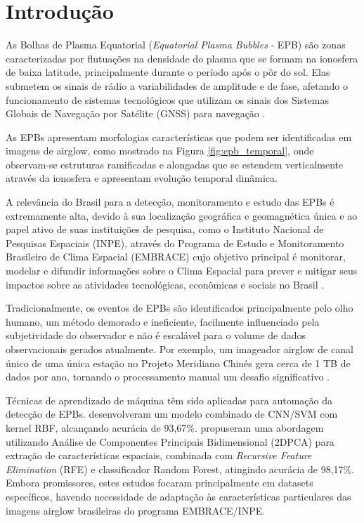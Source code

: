 \chapter{Introdução}

As Bolhas de Plasma Equatorial (\textit{Equatorial Plasma Bubbles} - EPB) são zonas caracterizadas por flutuações na densidade do plasma que se formam na ionosfera de baixa latitude, principalmente durante o período após o pôr do sol. Elas submetem os sinais de rádio a variabilidades de amplitude e de fase, afetando o funcionamento de sistemas tecnológicos que utilizam os sinais dos Sistemas Globais de Navegação por Satélite (GNSS) para navegação \cite{Githio2024}.

As EPBs apresentam morfologias características que podem ser identificadas em imagens de airglow, como mostrado na Figura \ref{fig:epb_temporal}, onde observam-se estruturas ramificadas e alongadas que se estendem verticalmente através da ionosfera e apresentam evolução temporal dinâmica.

A relevância do Brasil para a detecção, monitoramento e estudo das EPBs é extremamente alta, devido à sua localização geográfica e geomagnética única e ao papel ativo de suas instituições de pesquisa, como o Instituto Nacional de Pesquisas Espaciais (INPE), através do Programa de Estudo e Monitoramento Brasileiro de Clima Espacial (EMBRACE) cujo objetivo principal é monitorar, modelar e difundir informações sobre o Clima Espacial para prever e mitigar seus impactos sobre as atividades tecnológicas, econômicas e sociais no Brasil \cite{EMBRACE2021}.

Tradicionalmente, os eventos de EPBs são identificados principalmente pelo olho humano, um método demorado e ineficiente, facilmente influenciado pela subjetividade do observador e não é escalável para o volume de dados observacionais gerados atualmente. Por exemplo, um imageador airglow de canal único de uma única estação no Projeto Meridiano Chinês gera cerca de 1 TB de dados por ano, tornando o processamento manual um desafio significativo \cite{Zhong2025}.

Técnicas de aprendizado de máquina têm sido aplicadas para automação da detecção de EPBs.  desenvolveram um modelo combinado de CNN/SVM com kernel RBF, alcançando acurácia de 93,67\%.  propuseram uma abordagem utilizando Análise de Componentes Principais Bidimensional (2DPCA) para extração de características espaciais, combinada com \textit{Recursive Feature Elimination} (RFE) e classificador Random Forest, atingindo acurácia de 98,17\%. Embora promissores, estes estudos focaram principalmente em datasets específicos, havendo necessidade de adaptação às características particulares das imagens airglow brasileiras do programa EMBRACE/INPE.

